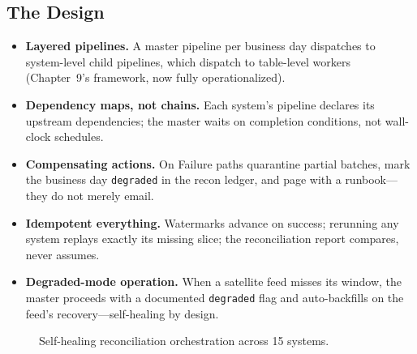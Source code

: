 \subsection{The Design}
\begin{itemize}
    \item \textbf{Layered pipelines.} A master pipeline per business day dispatches to system-level child pipelines, which dispatch to table-level workers (Chapter~9's framework, now fully operationalized).
    \item \textbf{Dependency maps, not chains.} Each system's pipeline declares its upstream dependencies; the master waits on completion conditions, not wall-clock schedules.
    \item \textbf{Compensating actions.} On Failure paths quarantine partial batches, mark the business day \texttt{degraded} in the recon ledger, and page with a runbook---they do not merely email.
    \item \textbf{Idempotent everything.} Watermarks advance on success; rerunning any system replays exactly its missing slice; the reconciliation report compares, never assumes.
    \item \textbf{Degraded-mode operation.} When a satellite feed misses its window, the master proceeds with a documented \texttt{degraded} flag and auto-backfills on the feed's recovery---self-healing by design.
\end{itemize}

\begin{figure}[H]
    \centering
    \caption{Self-healing reconciliation orchestration across 15 systems.}
    \label{fig:chapter12-recon}
\end{figure}

